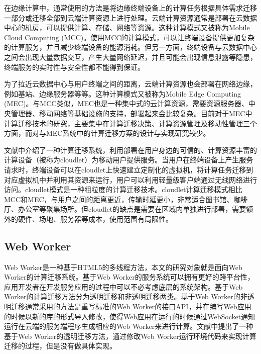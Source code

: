 在边缘计算中，通常使用的方法是将边缘终端设备上的计算任务根据具体需求迁移一部分或迁移全部到云端计算资源上进行处理。云端计算资源通常是部署在云数据中心的机房，可以提供计算、存储、网络等资源。这种计算模式又被称为Mobile Cloud Computing (MCC)\cite{barbarossa2014communicating}。使用MCC的计算模式，可以让终端设备提供更加复杂的计算服务，并且减少终端设备的能源消耗。但另一方面，终端设备与云数据中心之间会出现大量数据交互，产生大量网络延迟，并且可能会出现信息泄露等隐患，终端服务的实时性与安全性都不能得到保证\cite{shi2016edge}。

为了拉近云数据中心与用户终端之间的距离，云端计算资源也会部署在网络边缘，例如基站、边缘服务器等等。这种计算模式又被称为Mobile Edge Computing (MEC)\cite{董浩2019移动边缘计算环境下服务工作流的计算卸载}。与MCC类似，MEC也是一种集中式的云计算资源，需要资源服务器、中央管理器、移动网络等基础设施的支持，部署起来会比较复杂。目前对于MEC中计算迁移技术的研究，主要集中在计算迁移决策、计算资源管理及移动性管理三个方面，而对与MEC系统中的计算迁移方案的设计与实现研究较少\cite{谢人超2018移动边缘计算卸载技术综述}。

文献\cite{satyanarayanan2009case}中介绍了一种计算迁移系统，利用部署在用户身边的可信的、计算资源丰富的计算设备（被称为cloudlet）为移动用户提供服务。当用户在终端设备上产生服务请求时，终端设备可以在cloudlet上快速建立定制化的虚拟机，将计算任务迁移到对应虚拟机中并利用其资源来运行，用户可以利用轻量级客户端通过无线网络进行访问\cite{verbelen2012cloudlets}。cloudlet模式是一种粗粒度的计算迁移技术\cite{谢人超2018移动边缘计算卸载技术综述}。cloudlet计算迁移模式相比MCC和MEC，与用户之间的距离更近，传输时延更小，非常适合图书馆、咖啡厅、办公室等聚集场所。但cloudlet的缺点是需要在区域内单独进行部署，需要额外的硬件、场地、服务器等成本，使用范围有局限性\cite{li2014can,zhang2018hybrid}。

\subsection{Web Worker}

Web Worker是一种基于HTML5的多线程方法，本文的研究对象就是面向Web Worker的计算迁移系统。基于Web Worker的服务系统可以拥有更好的跨平台性，应用开发者在开发服务应用的过程中可以不必考虑底层的系统架构\cite{王硕2016嵌入式}。基于Web Worker的计算迁移方法分为透明迁移和非透明迁移两类\cite{wang2018html5}。基于Web Worker的非透明迁移通常采用的方法是重写标准的Web Worker的接口API，并在编写Web应用的时候以新的库的形式导入修改，使得Web应用在运行的时候通过WebSocket通知运行在云端的服务端程序生成相应的Web Worker来进行计算\cite{zbierski2014bring,hwang2014wwf,hwang2014cloud,gong2016wwof,kurumatani2012executing}。文献\cite{zhang2010elastic}中提出了一种基于Web Worker的透明迁移方法，通过修改Web Worker运行环境代码来实现计算迁移的过程，但是没有做具体实现。

